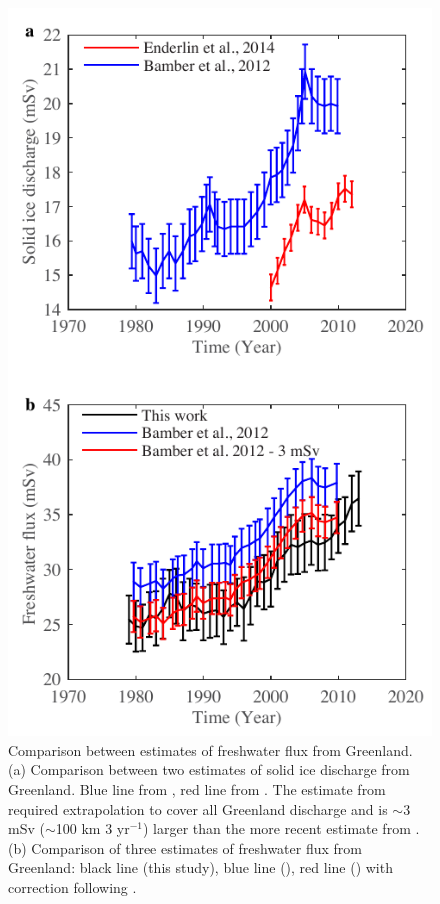 \clearpage
\begin{figure}
	\centering
	\includegraphics{figs_app/FigS4.pdf}
	\caption[Comparison between estimates of freshwater flux from Greenland.]{Comparison between estimates of freshwater flux from Greenland.  (a) Comparison between two estimates of solid ice discharge from Greenland.  Blue line from \citet{bamber2012recent}, red line from \citet{enderlin2014improved}.  The estimate from \citet{bamber2012recent} required extrapolation to cover all Greenland discharge and is $\sim$3 mSv ($\sim$100 km 3 yr$^{-1}$) larger than the more recent estimate from \citet{enderlin2014improved}. (b) Comparison of three estimates of freshwater flux from Greenland: black line (this study), blue line (\citet{bamber2012recent}), red line (\citet{bamber2012recent}) with correction following \citet{enderlin2014improved}.}
	\label{fig:SI4_fig4}
\end{figure}

